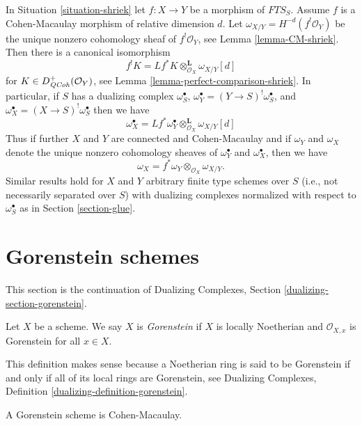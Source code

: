 \begin{remark}
\label{remark-CM-morphism-compare-dualizing}
In Situation \ref{situation-shriek} let $f : X \to Y$ be a morphism
of $\textit{FTS}_S$. Assume $f$ is a Cohen-Macaulay morphism of
relative dimension $d$. Let $\omega_{X/Y} = H^{-d}(f^!\mathcal{O}_Y)$
be the unique nonzero cohomology sheaf of $f^!\mathcal{O}_Y$, see
Lemma \ref{lemma-CM-shriek}.
Then there is a canonical isomorphism
$$
f^!K = Lf^*K \otimes_{\mathcal{O}_X}^\mathbf{L} \omega_{X/Y}[d]
$$
for $K \in D^+_{\mathit{QCoh}}(\mathcal{O}_Y)$, see
Lemma \ref{lemma-perfect-comparison-shriek}. In particular, if
$S$ has a dualizing complex $\omega_S^\bullet$,
$\omega_Y^\bullet = (Y \to S)^!\omega_S^\bullet$, and
$\omega_X^\bullet = (X \to S)^!\omega_S^\bullet$
then we have
$$
\omega_X^\bullet =
Lf^*\omega_Y^\bullet \otimes_{\mathcal{O}_X}^\mathbf{L} \omega_{X/Y}[d]
$$
Thus if further $X$ and $Y$ are connected and Cohen-Macaulay and
if $\omega_Y$ and $\omega_X$ denote the unique nonzero cohomology
sheaves of $\omega_Y^\bullet$ and $\omega_X^\bullet$, then we
have
$$
\omega_X = f^*\omega_Y \otimes_{\mathcal{O}_X} \omega_{X/Y}.
$$
Similar results hold for $X$ and $Y$ arbitrary finite type schemes
over $S$ (i.e., not necessarily separated over $S$)
with dualizing complexes normalized with respect to
$\omega_S^\bullet$ as in Section \ref{section-glue}.
\end{remark}





\section{Gorenstein schemes}
\label{section-gorenstein}

\noindent
This section is the continuation of Dualizing Complexes, Section
\ref{dualizing-section-gorenstein}.

\begin{definition}
\label{definition-gorenstein}
Let $X$ be a scheme. We say $X$ is {\it Gorenstein} if $X$ is
locally Noetherian and $\mathcal{O}_{X, x}$ is Gorenstein for all $x \in X$.
\end{definition}

\noindent
This definition makes sense because a Noetherian ring is said to
be Gorenstein if and only if all of its local rings are Gorenstein,
see Dualizing Complexes, Definition \ref{dualizing-definition-gorenstein}.

\begin{lemma}
\label{lemma-gorenstein-CM}
A Gorenstein scheme is Cohen-Macaulay.
\end{lemma}

